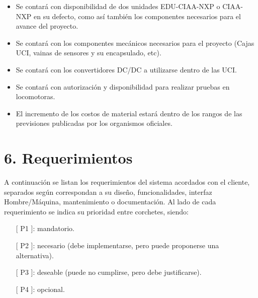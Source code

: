 \documentclass[
11pt, %
codirector, %
]{charter}
\begin{document}
\begin{itemize}
	\item Se contará con disponibilidad de dos unidades EDU-CIAA-NXP o CIAA-NXP en su defecto, como así también los componentes necesarios para el avance del proyecto.
	\item Se contará con los componentes mecánicos necesarios para el proyecto (Cajas UCI, vainas de sensores y su encapsulado, etc).
	\item Se contará con los convertidores DC/DC a utilizarse dentro de las UCI. 
	\item Se contará con autorización y disponibilidad para realizar pruebas en locomotoras.
	\item El incremento de los costos de material estará dentro de los rangos de las previsiones publicadas por los organismos oficiales.
\end{itemize}


\section{6. Requerimientos}
\label{sec:requerimientos}

A continuación se listan los requerimientos del sistema acordados con el cliente, separados según correspondan a su diseño, funcionalidades, interfaz Hombre/Máquina, mantenimiento o documentación. Al lado de cada requerimiento se indica su prioridad entre corchetes, siendo:
\begin{itemize}
	\item [[ P1]]: mandatorio.
	\item [[ P2]]: necesario (debe implementarse, pero puede proponerse una alternativa).
	\item [[ P3]]: deseable (puede no cumplirse, pero debe justificarse).
	\item [[ P4]]: opcional.
\end{itemize} 
\end{document}

